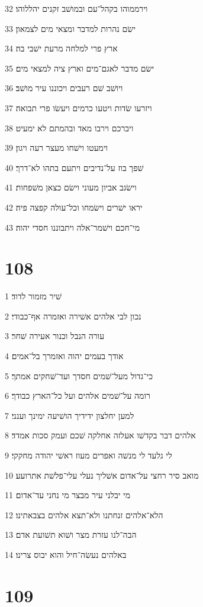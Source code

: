 \par 32 וירממוהו בקהל־עם ובמושׁב זקנים יהללוהו׃
\par 33 ישׂם נהרות למדבר ומצאי מים לצמאון׃
\par 34 ארץ פרי למלחה מרעת ישׁבי בה׃
\par 35 ישׂם מדבר לאגם־מים וארץ ציה למצאי מים׃
\par 36 ויושׁב שׁם רעבים ויכוננו עיר מושׁב׃
\par 37 ויזרעו שׂדות ויטעו כרמים ויעשׂו פרי תבואה׃
\par 38 ויברכם וירבו מאד ובהמתם לא ימעיט׃
\par 39 וימעטו וישׁחו מעצר רעה ויגון׃
\par 40 שׁפך בוז על־נדיבים ויתעם בתהו לא־דרך׃
\par 41 וישׂגב אביון מעוני וישׂם כצאן משׁפחות׃
\par 42 יראו ישׁרים וישׂמחו וכל־עולה קפצה פיה׃
\par 43 מי־חכם וישׁמר־אלה ויתבוננו חסדי יהוה׃

\chapter{108}

\par 1 שׁיר מזמור לדוד׃
\par 2 נכון לבי אלהים אשׁירה ואזמרה אף־כבודי׃
\par 3 עורה הנבל וכנור אעירה שׁחר׃
\par 4 אודך בעמים יהוה ואזמרך בל־אמים׃
\par 5 כי־גדול מעל־שׁמים חסדך ועד־שׁחקים אמתך׃
\par 6 רומה על־שׁמים אלהים ועל כל־הארץ כבודך׃
\par 7 למען יחלצון ידידיך הושׁיעה ימינך וענני׃
\par 8 אלהים דבר בקדשׁו אעלזה אחלקה שׁכם ועמק סכות אמדד׃
\par 9 לי גלעד לי מנשׁה ואפרים מעוז ראשׁי יהודה מחקקי׃
\par 10 מואב סיר רחצי על־אדום אשׁליך נעלי עלי־פלשׁת אתרועע׃
\par 11 מי יבלני עיר מבצר מי נחני עד־אדום׃
\par 12 הלא־אלהים זנחתנו ולא־תצא אלהים בצבאתינו׃
\par 13 הבה־לנו עזרת מצר ושׁוא תשׁועת אדם׃
\par 14 באלהים נעשׂה־חיל והוא יבוס צרינו׃

\chapter{109}

